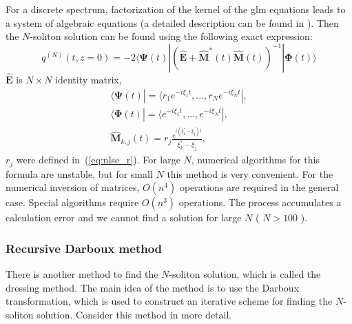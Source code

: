 For a discrete spectrum, factorization of the kernel of the \acrshort{glm} equations leads to a system of algebraic equations (a detailed description can be found in \cite{lamb1980}). Then the $ N $-soliton solution can be found using the following exact expression:
\begin{equation}
    q^{(N)}(t, z = 0) = -2 \langle \mathbf{\Psi}(t) | (\widehat{\mathbf{E}} + 
    \widehat{\mathbf{M}}^*(t) \widehat{\mathbf{M}}(t) )^{-1} | \mathbf{\Phi}(t) \rangle
\end{equation}
$\widehat{\mathbf{E}}$ is $N \times N$ identity matrix,
\begin{eqnarray}
    \langle \mathbf{\Psi}(t) | = \langle r_1 e^{-i \xi_1 t}, ... , r_N e^{-i \xi_N t} | {,} \nonumber \\
    \langle \mathbf{\Phi}(t) | = \langle e^{-i \xi_1 t}, ... , e^{-i \xi_N t} | {,} \nonumber \\
    \widehat{\mathbf{M}}_{k,j}(t) = r_j \frac{e^{i (\xi_k^{*} - \xi_j) t}}{\xi_k^{*} - \xi_j} {,}
\end{eqnarray}
$r_j$ were defined in~(\ref{eq:nlse_r}).
For large $ N $, numerical algorithms for this formula are unstable, but for small $ N $ this method is very convenient. For the numerical inversion of matrices, $O(n^4)$ operations are required in the general case. Special algorithms require $O(n^3)$ operations. The process accumulates a calculation error and we cannot find a solution for large $N$ ( $N > 100$ ).

\subsubsection{Recursive Darboux method}

There is another method to find the $N$-soliton solution, which is called the dressing method. The main idea of the method is to use the Darboux transformation, which is used to construct an iterative scheme for finding the $ N $-soliton solution. Consider this method in more detail.

